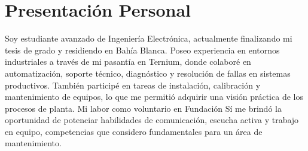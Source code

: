 
\section{Presentación Personal}


Soy estudiante avanzado de Ingeniería Electrónica, actualmente finalizando mi tesis de grado y residiendo en Bahía Blanca. Poseo experiencia en entornos industriales a través de mi pasantía en Ternium, donde colaboré en automatización, soporte técnico, diagnóstico y resolución de fallas en sistemas productivos. También participé en tareas de instalación, calibración y mantenimiento de equipos, lo que me permitió adquirir una visión práctica de los procesos de planta.
Mi labor como voluntario en Fundación Sí me brindó la oportunidad de potenciar habilidades de comunicación, escucha activa y trabajo en equipo, competencias que considero fundamentales para un área de mantenimiento.


